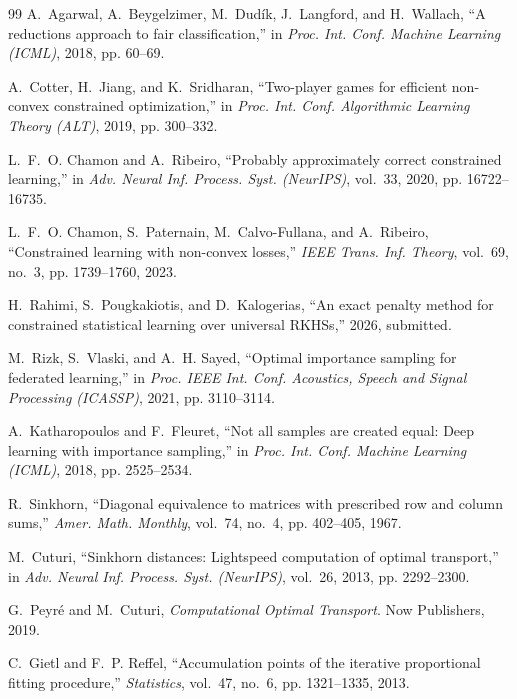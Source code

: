 \documentclass{article}
\theoremstyle{definition}
\begin{document}
\begin{thebibliography}{99}
A.~Agarwal, A.~Beygelzimer, M.~Dud\'{i}k, J.~Langford, and H.~Wallach, ``A
reductions approach to fair classification,'' in \emph{Proc. Int. Conf. Machine
Learning (ICML)}, 2018, pp. 60--69.

A.~Cotter, H.~Jiang, and K.~Sridharan, ``Two-player games for efficient
non-convex constrained optimization,'' in \emph{Proc. Int. Conf. Algorithmic
Learning Theory (ALT)}, 2019, pp. 300--332.

L.~F.~O. Chamon and A.~Ribeiro, ``Probably approximately correct constrained
learning,'' in \emph{Adv. Neural Inf. Process. Syst. (NeurIPS)}, vol.~33, 2020,
pp. 16722--16735.

L.~F.~O. Chamon, S.~Paternain, M.~Calvo-Fullana, and A.~Ribeiro, ``Constrained
learning with non-convex losses,'' \emph{IEEE Trans. Inf. Theory}, vol.~69,
no.~3, pp. 1739--1760, 2023.

H.~Rahimi, S.~Pougkakiotis, and D.~Kalogerias, ``An exact penalty method for
constrained statistical learning over universal RKHSs,'' 2026, submitted.

M.~Rizk, S.~Vlaski, and A.~H. Sayed, ``Optimal importance sampling for
federated learning,'' in \emph{Proc. IEEE Int. Conf. Acoustics, Speech and
Signal Processing (ICASSP)}, 2021, pp. 3110--3114.

A.~Katharopoulos and F.~Fleuret, ``Not all samples are created equal: Deep
learning with importance sampling,'' in \emph{Proc. Int. Conf. Machine
Learning (ICML)}, 2018, pp. 2525--2534.

R.~Sinkhorn, ``Diagonal equivalence to matrices with prescribed row and column
sums,'' \emph{Amer. Math. Monthly}, vol.~74, no.~4, pp. 402--405, 1967.

M.~Cuturi, ``Sinkhorn distances: Lightspeed computation of optimal transport,''
in \emph{Adv. Neural Inf. Process. Syst. (NeurIPS)}, vol.~26, 2013, pp.
2292--2300.

G.~Peyr\'{e} and M.~Cuturi, \emph{Computational Optimal Transport}. Now
Publishers, 2019.

C.~Gietl and F.~P. Reffel, ``Accumulation points of the iterative proportional
fitting procedure,'' \emph{Statistics}, vol.~47, no.~6, pp. 1321--1335, 2013.


\end{thebibliography}
\end{document}
